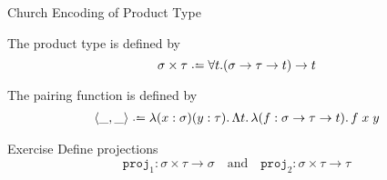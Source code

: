 \begin{frame}{Church Encoding of Product Type}
\begin{definition}
  The product type is defined by
  \[
    \sigma \times \tau \defeq \forall t. (\sigma \to \tau \to t) \to t
  \]
\end{definition}
The pairing function is defined by
\begin{align*}
  \left< \_, \_\right> \defeq \lambda (x : \sigma)(y : \tau).\,\Lambda t.\,\lambda (f : \sigma \to \tau \to t).\,
  f\;x\;y
\end{align*}
\begin{block}{Exercise}
Define projections 
\[
  \mathtt{proj}_1 : \sigma \times \tau \to \sigma
  \quad\text{and}\quad
  \mathtt{proj}_2 : \sigma\times \tau \to \tau
\]
\end{block}
\end{frame}
